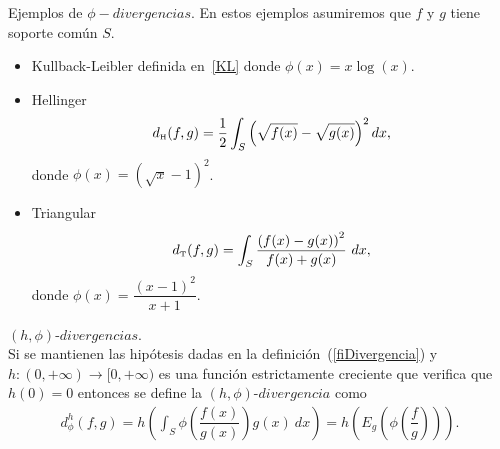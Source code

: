 \begin{example} Ejemplos de $\phi-divergencias$. En estos ejemplos asumiremos que $f$ y $g$ tiene soporte común $S$.
	\begin{itemize}
		\item Kullback-Leibler definida en~\eqref{KL} donde $\phi(x)=x \log(x)$.
		\item Hellinger
		\begin{align} 
		d_{\text{\tiny{H}}}(f,g)=\dfrac{1}{2} \displaystyle \int_{S} \left(\sqrt{f(x)}-\sqrt{g(x)}\right)^2 dx,
		\end{align}
		donde $\phi(x)=\left(\sqrt{x}-1\right)^2$.
		\item Triangular
		\begin{align}
		\label{triangular}
		d_{\text{\tiny{T}}}(f,g)=\displaystyle \int_{S} \dfrac{\left(f(x)-g(x)\right)^2}{f(x)+g(x)} \ dx,
		\end{align}
		donde $\phi(x)=\dfrac{\left(x-1 \right)^2}{x+1}$.
	\end{itemize}
\end{example}

\begin{definition} $\left(h,\phi\right) \text{-} divergencias$.\\
	\label{hfiDivergencia}
	Si se mantienen las hipótesis dadas en la definición~(\ref{fiDivergencia}) y $h: (0,+\infty)\longrightarrow [0,+\infty)$ es una función estrictamente creciente que verifica que $h(0)=0$ entonces se define la $\left(h,\phi\right) \text{-} divergencia$ como
	\begin{align}
	d^h_{\phi}(f, g)=h\left(\int_{S} \phi\left(\dfrac{f(x)}{g(x)}\right) g(x) \ dx\right)=h\left(E_{g}\left(\phi\left(\dfrac{f}{g}\right)\right)\right).
	\end{align}
\end{definition}

